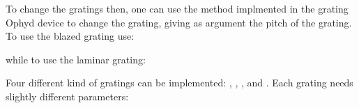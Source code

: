 \documentclass[letterpaper,10pt,english]{sphinxmanual}
\begin{document}
\begin{sphinxVerbatim}[commandchars=\\\{\}]
 
\end{sphinxVerbatim}

\sphinxAtStartPar
To change the gratings then, one can use the method implmented in the grating Ophyd device to change the grating, giving as
argument the pitch of the grating. To use the blazed grating use:

\begin{sphinxVerbatim}[commandchars=\\\{\}]
\end{sphinxVerbatim}

\sphinxAtStartPar
while to use the laminar grating:

\begin{sphinxVerbatim}[commandchars=\\\{\}]
\end{sphinxVerbatim}

\sphinxAtStartPar
Four different kind of gratings can be implemented: ,
, , and . Each grating needs slightly different
parameters:
\end{document}
